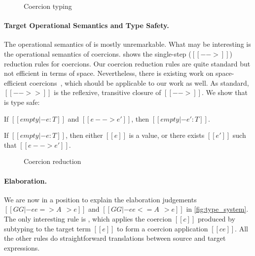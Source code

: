 \begin{figure}[t]
  \centering
  \caption{Coercion typing}
  \label{fig:co}
\end{figure}

\paragraph{Target Operational Semantics and Type Safety.}

The operational semantics of \tname is mostly unremarkable. What may be
interesting is the operational semantics of coercions. 
shows the single-step ($[[-->]]$) reduction rules for coercions. Our coercion
reduction rules are quite standard but not efficient in terms of space.
Nevertheless, there is existing work on space-efficient
coercions~\cite{Siek_2015, herman2010space}, which should be applicable
to our work as well.
As standard, $[[-->>]]$ is the reflexive, transitive closure of $[[-->]]$.
We show that \tname is type safe:
\begin{theorem}[Preservation]
  If $[[empty |- e : T]]$ and $[[e --> e']]$, then $[[empty |- e' : T]]$.
\end{theorem}
\begin{theorem}[Progress]
  If $[[empty |- e : T]]$, then either $[[e]]$ is a value, or there exists $[[e']]$ such
  that $[[e --> e']]$.
\end{theorem}


\begin{figure}[t]
  \centering
{}
  \caption{Coercion reduction}
  \label{fig:coercion_red}
\end{figure}



\paragraph{Elaboration.}
\begin{comment}
The subtyping judgement in \cref{fig:subtype_decl} has the form $[[A <: B ~~>
c]]$, which says that the subtyping
derivation of $[[A <: B]]$ produces a coercion $[[c]]$ that is used to convert a
term of type $[[ |A| ]]$ to type $[[ |B| ]]$. Each
subtyping rule has its own specific form of coercion.
\end{comment}
We are now in a position to explain the elaboration judgements $[[GG |- ee
=> A ~~> e]]$ and $[[GG |- ee <= A ~~> e]]$ in \cref{fig:type_system}. The only
interesting rule is , which applies the coercion $[[c]]$ produced by
subtyping to the target term $[[e]]$ to form a coercion application
$[[c e]]$. All the other rules do straightforward translations between
source and target expressions.


